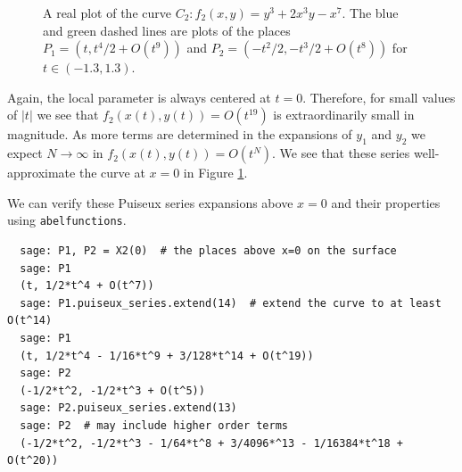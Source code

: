 \begin{example}
\begin{figure}
  \caption{A real plot of the curve $C_2: f_2(x,y) = y^3 + 2x^3y - x^7$. The
    blue and green dashed lines are plots of the places $P_1 = \left(t, t^4/2 +
      O(t^{9}) \right)$ and $P_2 = \left( -t^2/2, -t^3/2 + O(t^{8}) \right)$ for
    $t \in (-1.3, 1.3)$.}
  \label{fig:f2-puiseux}
  \end{figure}
  Again, the local parameter is always centered at $t=0$. Therefore, for small
  values of $|t|$ we see that $f_2\left(x(t), y(t)\right) = O(t^{19})$ is
  extraordinarily small in magnitude. As more terms are determined in the
  expansions of $y_1$ and $y_2$ we expect $N \to \infty$ in $f_2\left(x(t),
    y(t)\right) = O(t^N)$. We see that these series well-approximate the curve
  at $x=0$ in Figure \ref{fig:f2-puiseux}.
  
  We can verify these Puiseux series expansions above $x = 0$ and their
  properties using {\tt abelfunctions}.
  \begin{lstlisting}
  sage: P1, P2 = X2(0)  # the places above x=0 on the surface
  sage: P1
  (t, 1/2*t^4 + O(t^7))
  sage: P1.puiseux_series.extend(14)  # extend the curve to at least O(t^14)
  sage: P1
  (t, 1/2*t^4 - 1/16*t^9 + 3/128*t^14 + O(t^19))
  sage: P2
  (-1/2*t^2, -1/2*t^3 + O(t^5))
  sage: P2.puiseux_series.extend(13)  
  sage: P2  # may include higher order terms
  (-1/2*t^2, -1/2*t^3 - 1/64*t^8 + 3/4096*^13 - 1/16384*t^18 + O(t^20))
  \end{lstlisting}
\end{example}

